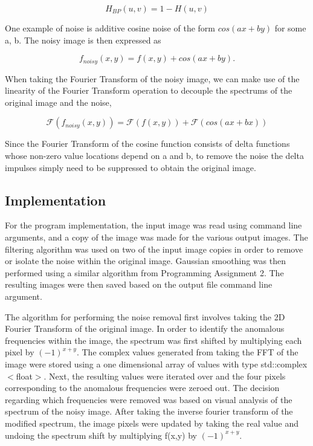\documentclass[headings=optiontoheadandtoc,listof=totoc,parskip=full]{scrartcl}
\begin{document}
\[
	H_{BP}(u,v) = 1 - H(u,v)
\]

One example of noise is additive cosine noise of the form \(cos(ax + by)\) for some a, b. The noisy image is then expressed as 

\[
	f_{noisy} (x, y) =  f(x, y) + cos(ax + by).
\]

When taking the Fourier Transform of the noisy image, we can make use of the linearity of the Fourier Transform operation to decouple the spectrums of the original image and the noise,

\[
	\mathcal{F}(f_{noisy}(x, y)) = \mathcal{F}( f(x, y) ) + \mathcal{F}(cos(ax + bx))
\]

Since the Fourier Transform of the cosine function consists of delta functions whose non-zero value locations depend on a and b, to remove the noise the delta impulses simply need to be suppressed to obtain the original image.



\subsection{Implementation}

For the program implementation, the input image was read using command line arguments, and a copy of the image was made for the various output images. The filtering algorithm was used on two of the input image copies in order to remove or isolate the noise within the original image. Gaussian smoothing was then performed using a similar algorithm from Programming Assignment 2. The resulting images were then saved based on the output file command line argument.

The algorithm for performing the noise removal first involves taking the 2D Fourier Transform of the original image. In order to identify the anomalous frequencies within the image, the spectrum was first shifted by multiplying each pixel by \((-1)^{x + y}\). The complex values generated from taking the FFT of the image were stored using a one dimensional array of values with type std::complex$<$float$>$. Next, the resulting values were iterated over and the four pixels corresponding to the anomalous frequencies were zeroed out. The decision regarding which frequencies were removed was based on visual analysis of the spectrum of the noisy image. After taking the inverse fourier transform of the modified spectrum, the image pixels were updated by taking the real value and undoing the spectrum shift by multiplying f(x,y) by \((-1)^{x + y}\).
\end{document}
